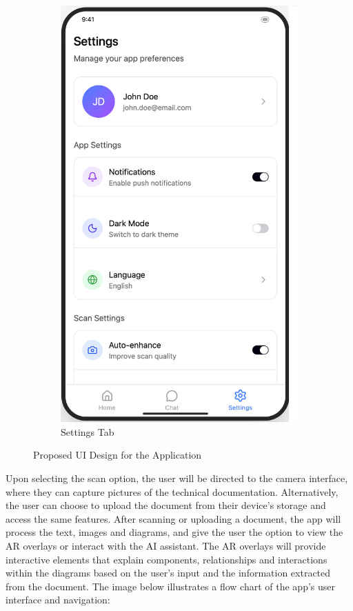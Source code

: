 \documentclass[12pt]{article}
\begin{document}
\begin{figure}
\begin{subfigure}{0.3\textwidth}
                \includegraphics[width=\textwidth]{img/FrontendSettingsTab.png}
                \caption{Settings Tab}
                \label{fig:SettingsTab}
            \end{subfigure}
            \caption{Proposed UI Design for the Application}
            \label{fig:UIDesign}
        \end{figure}

    Upon selecting the scan option, the user will be directed to the camera interface, where they can capture pictures of the technical documentation. Alternatively, the user can choose to upload the document from their device's storage and access the same features. After scanning or uploading
        a document, the app will process the text, images and diagrams, and give the user the option to view the AR overlays or interact with the AI assistant. The AR overlays will provide interactive elements that explain components, relationships and interactions within the diagrams based on the user's
        input and the information extracted from the document. The image below illustrates a flow chart of the app's user interface and navigation:
\end{document}
